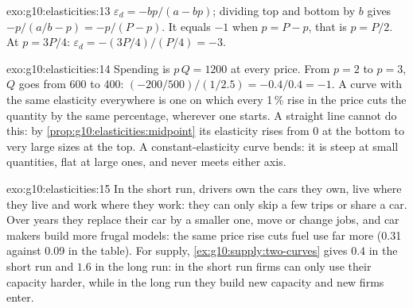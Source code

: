 \begin{solution}{exo:g10:elasticities:13}
$\varepsilon_d = -bp/(a - bp)$; dividing top and bottom by $b$ gives $-p/(a/b - p) = -p/(P - p)$. It equals $-1$ when $p = P - p$, that is $p = P/2$. At $p =
3P/4$: $\varepsilon_d = -(3P/4)/(P/4) = -3$.
\end{solution}

\begin{solution}{exo:g10:elasticities:14}
Spending is $p\,Q = 1200$ at every price. From $p = 2$ to $p = 3$, $Q$ goes from 600 to 400: $(-200/500)/(1/2.5) = -0.4/0.4 = -1$. A curve with the same elasticity
everywhere is one on which every 1\,\% rise in the price cuts the quantity by the same percentage, wherever one starts. A straight line cannot do this: by
\cref{prop:g10:elasticities:midpoint} its elasticity rises from 0 at the bottom to very large sizes at the top. A constant-elasticity curve bends: it is steep
at small quantities, flat at large ones, and never meets either axis.
\end{solution}

\begin{solution}{exo:g10:elasticities:15}
In the short run, drivers own the cars they own, live where they live and work where they work: they can only skip a few trips or share a car. Over years they
replace their car by a smaller one, move or change jobs, and car makers build more frugal models: the same price rise cuts fuel use far more (0.31 against 0.09
in the table). For supply, \cref{ex:g10:supply:two-curves} gives $0.4$ in the short run and $1.6$ in the long run: in the short run firms can only use their
capacity harder, while in the long run they build new capacity and new firms enter.
\end{solution}

